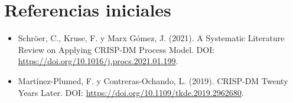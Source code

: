 \documentclass[12pt,a4paper]{article}
\begin{document}
\section{Referencias iniciales}
\begin{itemize}
\item Schröer, C., Kruse, F. y Marx Gómez, J. (2021). A Systematic Literature Review on Applying CRISP-DM Process Model. DOI: \url{https://doi.org/10.1016/j.procs.2021.01.199}.
\item Martínez-Plumed, F. y Contreras-Ochando, L. (2019). CRISP-DM Twenty Years Later. DOI: \url{https://doi.org/10.1109/tkde.2019.2962680}.
\end{itemize}
\end{document}
